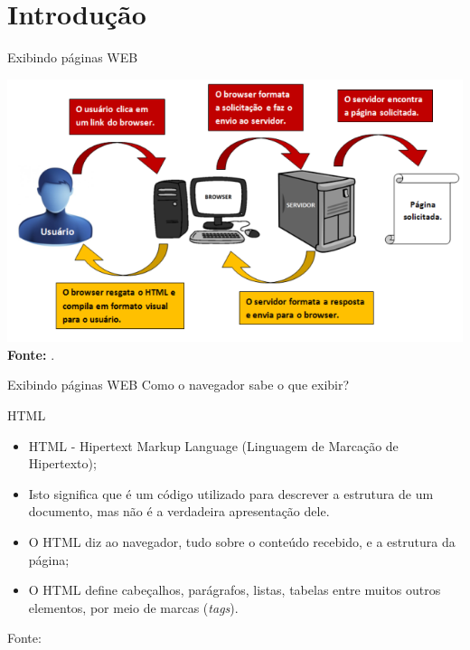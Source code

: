 \documentclass{beamer}
\begin{document}
\section{Introdução}
\begin{frame}{Exibindo páginas WEB}
		\begin{center}
\includegraphics[height=0.65\paperheight]{fig/aula1/funcionamentoweb.jpg} \\
    		\tiny \textbf{Fonte:} \cite{freeman2008use}.
		\end{center}
\end{frame}
\begin{frame}{Exibindo páginas WEB}
  Como o navegador sabe o que exibir?
  \begin{block}{HTML}
    \begin{itemize}
      \item HTML - Hipertext Markup Language (Linguagem de Marcação de 
Hipertexto);
       \item Isto significa que é um código utilizado para descrever a 
estrutura de um documento, mas não é a verdadeira apresentação dele.
       \item O HTML diz ao navegador, tudo sobre o conteúdo recebido, e 
a estrutura da página;
       \item O HTML define cabeçalhos, parágrafos, listas, tabelas entre 
muitos outros elementos, por meio de marcas (\textit{tags}).
    \end{itemize}
    \tiny{Fonte: \cite{marinho2016}}
  \end{block}
\end{frame}
\end{document}
